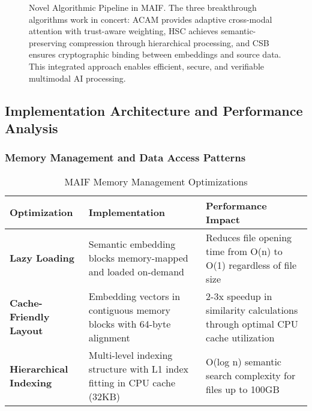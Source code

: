 \documentclass[conference]{IEEEtran}
\begin{document}
\begin{figure*}[!t]
\caption{Novel Algorithmic Pipeline in MAIF. The three breakthrough algorithms work in concert: ACAM provides adaptive cross-modal attention with trust-aware weighting, HSC achieves semantic-preserving compression through hierarchical processing, and CSB ensures cryptographic binding between embeddings and source data. This integrated approach enables efficient, secure, and verifiable multimodal AI processing.}
\label{fig:novel-algorithms}
\end{figure*}

\subsection{Implementation Architecture and Performance Analysis}

\subsubsection{Memory Management and Data Access Patterns}

\begin{table*}[!t]
\renewcommand{\arraystretch}{1.3}
\caption{MAIF Memory Management Optimizations}
\label{tab:memory-management}
\centering
\footnotesize
\begin{tabular}{p{3cm}p{6cm}p{5cm}}
\toprule
\textbf{Optimization} & \textbf{Implementation} & \textbf{Performance Impact} \\
\midrule
\textbf{Lazy Loading} & Semantic embedding blocks memory-mapped and loaded on-demand & Reduces file opening time from O(n) to O(1) regardless of file size \\
\textbf{Cache-Friendly Layout} & Embedding vectors in contiguous memory blocks with 64-byte alignment & 2-3x speedup in similarity calculations through optimal CPU cache utilization \\
\textbf{Hierarchical Indexing} & Multi-level indexing structure with L1 index fitting in CPU cache (32KB) & O(log n) semantic search complexity for files up to 100GB \\
\bottomrule
\end{tabular}
\end{table*}
\end{document}
